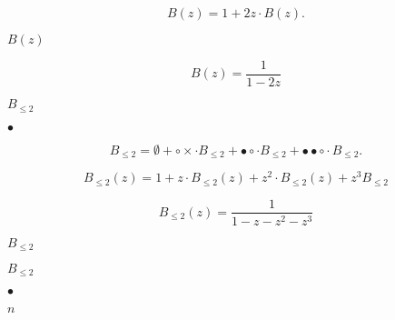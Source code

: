 \documentclass[10pt]{book}
\begin{document}
\begin{mdSnippets}
\begin{mdDisplaySnippet}[3359a0ee5a38412f5b8a9a46108a25b2]
\[%
B(z) = 1 + 2z\cdot B(z).
\]%
\end{mdDisplaySnippet}%
\begin{mdInlineSnippet}[73723f147a6eb605351fc7f278dcecef]%
$B(z)$\end{mdInlineSnippet}%
\begin{mdDisplaySnippet}[0ff8cbcdaa74bf811c9d6c11d98b136b]%
\[%
B(z) = \frac{1}{1-2z}
\]%
\end{mdDisplaySnippet}%
\begin{mdInlineSnippet}[1115e702e0237b316fbda63a111a29e5]%
$B_{\leq 2}$\end{mdInlineSnippet}%
\begin{mdInlineSnippet}[71976219fb1234a4f2ba6bef7a046183]%
$\bullet$\end{mdInlineSnippet}%
\begin{mdDisplaySnippet}[76100419ded65de5176c361a72d8235b]%
\[%
B_{\leq2} = \emptyset + \circ\times \cdot B_{\leq2} + \bullet\circ \cdot B_{\leq2} 
+\bullet\bullet\circ \cdot B_{\leq2}.
\]%
\end{mdDisplaySnippet}%
\begin{mdDisplaySnippet}[59e23d24b1c0fc680c52b781f7c52136]%
\[%
B_{\leq2}(z) = 1 + z\cdot B_{\leq 2}(z) + z^2\cdot B_{\leq 2}(z)+z^3 B_{\leq2}
\]%
\end{mdDisplaySnippet}%
\begin{mdDisplaySnippet}[03b813d449780dc7000064dd40b5bf64]%
\[%
B_{\leq2}(z)  = \frac{1}{1 - z - z^2 - z^3}
\]%
\end{mdDisplaySnippet}%
\begin{mdInlineSnippet}[79cb4a2c6de0786af0273a19f0234091]%
$B_{\leq2}$\end{mdInlineSnippet}%
\begin{mdInlineSnippet}[79cb4a2c6de0786af0273a19f0234091]%
$B_{\leq2}$\end{mdInlineSnippet}%
\begin{mdInlineSnippet}[71976219fb1234a4f2ba6bef7a046183]%
$\bullet$\end{mdInlineSnippet}%
\begin{mdInlineSnippet}[7b8b965ad4bca0e41ab51de7b31363a1]%
$n$\end{mdInlineSnippet}%

\end{mdSnippets}
\end{document}
